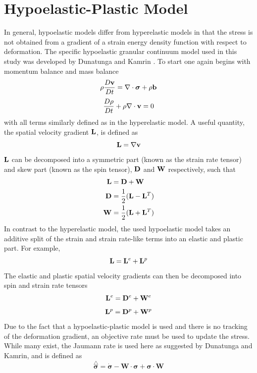 \section{Hypoelastic-Plastic Model} \label{hypoelastic_model}
In general, hypoelastic models differ from hyperelastic models in that the stress is not obtained from a gradient of a strain energy density function with respect to deformation. The specific hypoelastic granular continuum model used in this study was developed by Dunatunga and Kamrin \cite{Dunatunga:2015:Continuum}. To start one again begins with momentum balance and mass balance
\begin{equation}
\rho\frac{D\bold{v}}{Dt} = \nabla\cdot\bm{\sigma} + \rho\bold{b} \label{mom_bal}
\end{equation}
\begin{equation}
\frac{D\rho}{Dt} + \rho\nabla\cdot\bold{v}=0\label{mass_bal}
\end{equation}
with all terms similarly defined as in the hyperelastic model. A useful quantity, the spatial velocity gradient $\bold{L}$, is defined as
\begin{equation}
\bold{L}=\nabla\bold{v} \label{L_def}
\end{equation}
$\bold{L}$ can be decomposed into a symmetric part (known as the strain rate tensor) and skew part (known as the spin tensor), $\bold{D}$ and $\bold{W}$ respectively, such that
\begin{subequations}
\begin{align}
\bold{L}&=\bold{D}+\bold{W} \label{L_split} \\
\bold{D}&=\frac{1}{2}(\bold{L}-\bold{L}^T) \label{D_def} \\
\bold{W}&=\frac{1}{2}(\bold{L}+\bold{L}^T) \label{W_def}
\end{align}
\end{subequations}
In contrast to the hyperelastic model, the used hypoelastic model takes an additive split of the strain and strain rate-like terms into an elastic and plastic part. For example,
$$\bold{L}=\bold{L}^e+\bold{L}^p$$
The elastic and plastic spatial velocity gradients can then be decomposed into spin and strain rate tensors
$$\bold{L}^e=\bold{D}^e+\bold{W}^e$$
$$\bold{L}^p=\bold{D}^p+\bold{W}^p$$
Due to the fact that a hypoelastic-plastic  model is used and there is no tracking of the deformation gradient, an objective rate must be used to update the stress. While many exist, the Jaumann rate is used here as suggested by Dunatunga and Kamrin, and is defined as
\begin{equation}
\stackrel{\triangle}{\bm{\sigma}}=\dot{\bm{\sigma}}-\bm{W}\cdot\bm{\sigma}+\bm{\sigma}\cdot\bm{W}\label{Jaumann_rate}
\end{equation}
